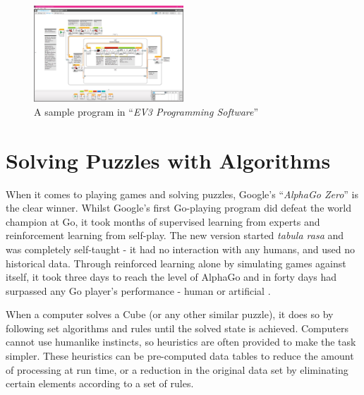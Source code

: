\documentclass{report}
\newcommand{\tit}[1]{\textit{#1}}
\newcommand{\propernoun}[1]{\enquote{\tit{#1}}}
\begin{document}
	\begin{figure}[H]
		\centering
		\includegraphics[width=0.5\textwidth]{Resources/Images/scrEV3ProgrammingSoftware.jpg}
		\caption{A sample program in \propernoun{EV3 Programming Software}}
		\label{fig:ev3software}
	\end{figure}
    
    \section{Solving Puzzles with Algorithms}
    When it comes to playing games and solving puzzles, Google's \propernoun{AlphaGo Zero} is the clear winner. Whilst Google's first Go-playing program did defeat the world champion at Go, it took months of supervised learning from experts and reinforcement learning from self-play. The new version started \tit{tabula rasa} and was completely self-taught - it had no interaction with any humans, and used no historical data. Through reinforced learning alone by simulating games against itself, it took three days to reach the level of AlphaGo and in forty days had surpassed any Go player's performance - human or artificial \cite{Silver2017, Cellan-Jones2017}.
    
    When a computer solves a Cube (or any other similar puzzle), it does so by following set algorithms and rules until the solved state is achieved. Computers cannot use humanlike instincts, so heuristics are often provided to make the task simpler. These heuristics can be pre-computed data tables to reduce the amount of processing at run time, or a reduction in the original data set by eliminating certain elements according to a set of rules.
    
\end{document}
